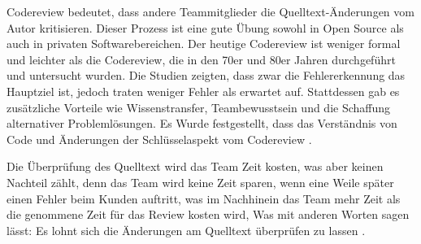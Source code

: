 
Codereview bedeutet, dass andere Teammitglieder die Quelltext-Änderungen vom Autor kritisieren. Dieser Prozess ist eine gute Übung sowohl in Open Source als auch in privaten Softwarebereichen. Der heutige Codereview ist weniger formal und leichter als die Codereview, die in den 70er und 80er Jahren durchgeführt und untersucht wurden. Die Studien zeigten, dass zwar die Fehlererkennung das Hauptziel ist, jedoch traten weniger Fehler als erwartet auf. Stattdessen gab es zusätzliche Vorteile wie Wissenstransfer, Teambewusstsein und die Schaffung alternativer Problemlösungen. Es Wurde festgestellt, dass das Verständnis von Code und Änderungen der Schlüsselaspekt vom Codereview \cite{bacchelli2013expectations}.

Die Überprüfung des Quelltext wird das Team Zeit kosten, was aber keinen Nachteil zählt, denn das Team wird keine Zeit sparen, wenn eine Weile später einen Fehler beim Kunden auftritt, was im Nachhinein das Team mehr Zeit als die genommene Zeit für das Review kosten wird, Was mit anderen Worten sagen lässt: Es lohnt sich die Änderungen am Quelltext überprüfen zu lassen \cite{Bjoern}.